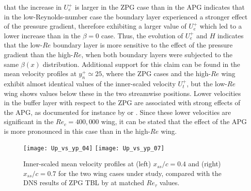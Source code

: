 that the increase in $U^{+}_{e}$ is larger in the ZPG case than in the APG indicates that in the low-Reynolds-number case the boundary layer experienced a stronger effect of the pressure gradient, therefore exhibiting a larger value of $U^{+}_{e}$ which led to a lower increase than in the $\beta=0$ case. Thus, the evolution of $U^{+}_{e}$ and $H$ indicates that the low-$Re$ boundary layer is more sensitive to the effect of the pressure gradient than the high-$Re$, when both boundary layers were subjected to the same $\beta(x)$ distribution. Additional support for this claim can be found in the mean velocity profiles at $y^{+}_{n} \simeq 25$, where the ZPG cases and the high-$Re$ wing exhibit almost identical values of the inner-scaled velocity $U^{+}_{t}$, but the low-$Re$ wing shows values below these in the two streamwise positions. Lower velocities in the buffer layer with respect to the ZPG are associated with strong effects of the APG, as documented for instance by \cite{spalart_watmuff} or \cite{bobke_et_al}. Since these lower velocities are significant in the $Re_{c}=400,000$ wing, it can be stated that the effect of the APG is more pronounced in this case than in the high-$Re$ wing.
\begin{figure}[t]
\centering
\texttt{[image: Up\_vs\_yp\_04]}
\texttt{[image: Up\_vs\_yp\_07]}
\caption{Inner-scaled mean velocity profiles at (left) $x_{ss}/c=0.4$ and (right) $x_{ss}/c=0.7$ for the two wing cases under study, compared with the DNS results of ZPG TBL by \cite{schlatter_orlu10} at matched $Re_{\tau}$ values.}
\label{Up_vs_yp}
\end{figure}

